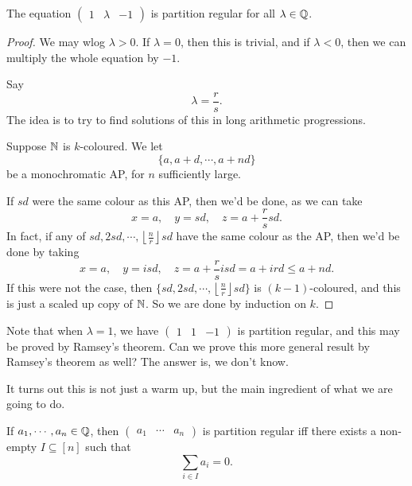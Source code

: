 \documentclass[a4paper]{article}
\begin{document}
  \begin{prop}
    The equation $\begin{pmatrix}1 & \lambda & -1\end{pmatrix}$ is partition regular for all $\lambda \in \mathbb{Q}$.
  \end{prop}

  \begin{proof}
    We may wlog $\lambda > 0$. If $\lambda = 0$, then this is trivial, and if $\lambda < 0$, then we can multiply the whole equation by $-1$.

    Say
    \[
      \lambda = \frac{r}{s}.
    \]
    The idea is to try to find solutions of this in long arithmetic progressions.

    Suppose $\mathbb{N}$ is $k$-coloured. We let
    \[
      \{a, a + d, \cdots, a + nd\}
    \]
    be a monochromatic AP, for $n$ sufficiently large.

    If $sd$ were the same colour as this AP, then we'd be done, as we can take
    \[
      x = a,\quad y = sd,\quad z = a + \frac{r}{s} sd.
    \]
    In fact, if any of $sd, 2sd, \cdots, \left\lfloor\frac{n}{r}\right\rfloor sd$ have the same colour as the AP, then we'd be done by taking
    \[
      x = a,\quad y = isd,\quad z = a + \frac{r}{s} isd = a + ird \leq a + nd.
    \]
    If this were not the case, then $\{sd, 2sd, \cdots, \left\lfloor\frac{n}{r}\right\rfloor sd\}$ is $(k - 1)$-coloured, and this is just a scaled up copy of $\mathbb{N}$. So we are done by induction on $k$.
  \end{proof}

  Note that when $\lambda = 1$, we have $\begin{pmatrix}1 & 1 & -1\end{pmatrix}$ is partition regular, and this may be proved by Ramsey's theorem. Can we prove this more general result by Ramsey's theorem as well? The answer is, we don't know.

  It turns out this is not just a warm up, but the main ingredient of what we are going to do.

  \begin{thm}
    If $a_1,\cdots, a_n \in \mathbb{Q}$, then $\begin{pmatrix} a_1 & \cdots & a_n \end{pmatrix}$ is partition regular iff there exists a non-empty $I \subseteq [n]$ such that
    \[
      \sum_{i \in I} a_i = 0.
    \]
  \end{thm}
\end{document}
